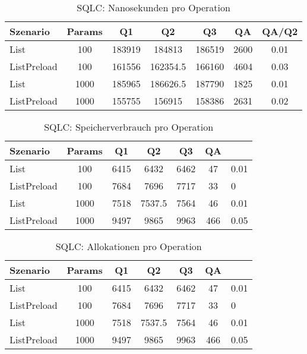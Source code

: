 
\begin{table}[ht]
\centering
\caption{SQLC: Nanosekunden pro Operation}
\begin{tabular}{lcccccc}
\toprule
Szenario & Params & Q1 & Q2 & Q3 & QA & QA/Q2 \\
\midrule
	List & 100 & 183919 & 184813 & 186519 & 2600 & 0.01 \\
	ListPreload & 100 & 161556 & 162354.5 & 166160 & 4604 & 0.03 \\
	List & 1000 & 185965 & 186626.5 & 187790 & 1825 & 0.01 \\
	ListPreload & 1000 & 155755 & 156915 & 158386 & 2631 & 0.02 \\
\bottomrule
\end{tabular}
\label{tab:benchmark_sqlc_nsperop}
\end{table}
	
\begin{table}[ht]
\centering
\caption{SQLC: Speicherverbrauch pro Operation}
\begin{tabular}{lccccc}
\toprule
Szenario & Params & Q1 & Q2 & Q3 & QA \\
\midrule
	List & 100 & 6415 & 6432 & 6462 & 47 & 0.01 \\
	ListPreload & 100 & 7684 & 7696 & 7717 & 33 & 0 \\
	List & 1000 & 7518 & 7537.5 & 7564 & 46 & 0.01 \\
	ListPreload & 1000 & 9497 & 9865 & 9963 & 466 & 0.05 \\
\bottomrule
\end{tabular}
\label{tab:benchmark_sqlc_bytesperop}
\end{table}
	
\begin{table}[ht]
\centering
\caption{SQLC: Allokationen pro Operation}
\begin{tabular}{lccccc}
\toprule
Szenario & Params & Q1 & Q2 & Q3 & QA \\
\midrule
	List & 100 & 6415 & 6432 & 6462 & 47 & 0.01 \\
	ListPreload & 100 & 7684 & 7696 & 7717 & 33 & 0 \\
	List & 1000 & 7518 & 7537.5 & 7564 & 46 & 0.01 \\
	ListPreload & 1000 & 9497 & 9865 & 9963 & 466 & 0.05 \\
\bottomrule
\end{tabular}
\label{tab:benchmark_sqlc_allocsperop}
\end{table}
	